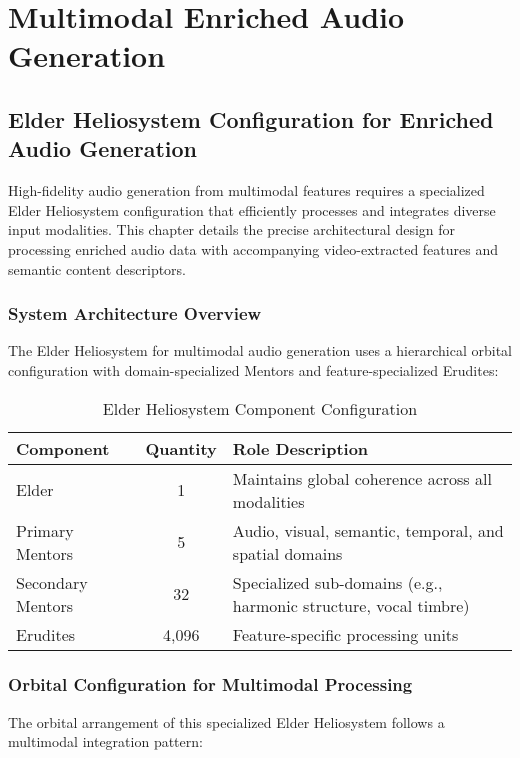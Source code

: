 \chapter{Multimodal Enriched Audio Generation}

\section{Elder Heliosystem Configuration for Enriched Audio Generation}

High-fidelity audio generation from multimodal features requires a specialized Elder Heliosystem configuration that efficiently processes and integrates diverse input modalities. This chapter details the precise architectural design for processing enriched audio data with accompanying video-extracted features and semantic content descriptors.

\subsection{System Architecture Overview}

The Elder Heliosystem for multimodal audio generation uses a hierarchical orbital configuration with domain-specialized Mentors and feature-specialized Erudites:

\begin{table}[h]
\centering
\begin{tabular}{|l|c|l|}
\hline
\textbf{Component} & \textbf{Quantity} & \textbf{Role Description} \\
\hline
Elder & 1 & Maintains global coherence across all modalities \\
\hline
Primary Mentors & 5 & Audio, visual, semantic, temporal, and spatial domains \\
\hline
Secondary Mentors & 32 & Specialized sub-domains (e.g., harmonic structure, vocal timbre) \\
\hline
Erudites & 4,096 & Feature-specific processing units \\
\hline
\end{tabular}
\caption{Elder Heliosystem Component Configuration}
\end{table}

\subsection{Orbital Configuration for Multimodal Processing}

The orbital arrangement of this specialized Elder Heliosystem follows a multimodal integration pattern:

